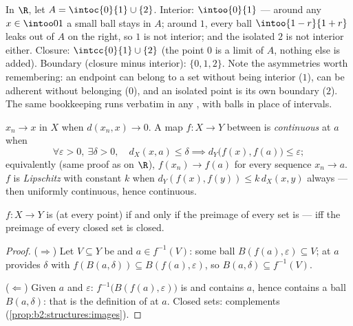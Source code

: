 \begin{example}\label{ex:b2:metric:intclosure}
In $\R$, let $A = \intoc{0}{1} \cup \{2\}$. Interior:
$\intoo{0}{1}$ --- around any $x \in \intoo01$ a small ball
stays in $A$; around $1$, every ball $\intoo{1-r}{1+r}$ leaks
out of $A$ on the right, so $1$ is not interior; and the
isolated $2$ is not interior either. Closure:
$\intcc{0}{1} \cup \{2\}$ (the point $0$ is a limit of $A$,
nothing else is added). Boundary (closure minus interior):
$\{0, 1, 2\}$. Note the asymmetries worth remembering: an
endpoint can belong to a set without being interior ($1$), can
be adherent without belonging ($0$), and an isolated point is
its own boundary ($2$). The same bookkeeping runs verbatim in
any , with balls in place of intervals.
\end{example}

\begin{definition}\label{def:b2:metric:continuity}
$x_n \to x$ in $X$ when $d(x_n, x) \to 0$. A map $f \colon X \to Y$
between  is \emph{continuous} at $a$ when
\[
\forall \varepsilon > 0,\ \exists\delta > 0,\quad
d_X(x, a) \leq \delta \implies d_Y\bigl(f(x), f(a)\bigr) \leq
\varepsilon ;
\]
equivalently (same proof as on $\R$), $f(x_n) \to f(a)$ for every
sequence $x_n \to a$. $f$ is \emph{Lipschitz} with constant $k$ when
$d_Y(f(x), f(y)) \leq k\, d_X(x, y)$ always --- then uniformly
continuous, hence continuous.
\end{definition}

\begin{theorem}\label{thm:b2:metric:globalcontinuity}
$f \colon X \to Y$ is  (at every point) if and only if the
preimage of every  set is  --- iff the preimage of every
closed set is closed.
\end{theorem}

\begin{proof}
($\Rightarrow$) Let $V \subseteq Y$ be  and $a \in f^{-1}(V)$:
some ball $B(f(a), \varepsilon) \subseteq V$;  at $a$
provides $\delta$ with $f(B(a, \delta)) \subseteq B(f(a),
\varepsilon)$, so $B(a, \delta) \subseteq f^{-1}(V)$.

($\Leftarrow$) Given $a$ and $\varepsilon$: $f^{-1}\bigl(B(f(a),
\varepsilon)\bigr)$ is  and contains $a$, hence contains a ball
$B(a, \delta)$: that is the definition of  at $a$. Closed
sets: complements (\cref{prop:b2:structures:images}).
\end{proof}

